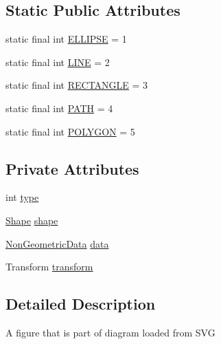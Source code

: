 \subsection*{Static Public Attributes}
\begin{DoxyCompactItemize}
\item 
static final int \mbox{\hyperlink{classorg_1_1newdawn_1_1slick_1_1svg_1_1_figure_a3754f01dc8ef5e4b0f610afbba382a7e}{E\+L\+L\+I\+P\+SE}} = 1
\item 
static final int \mbox{\hyperlink{classorg_1_1newdawn_1_1slick_1_1svg_1_1_figure_aa7aa5c6edabf75145d536a9e5a2eb0fc}{L\+I\+NE}} = 2
\item 
static final int \mbox{\hyperlink{classorg_1_1newdawn_1_1slick_1_1svg_1_1_figure_a33b1b86b98b3d31f811d6508dcf2ce7c}{R\+E\+C\+T\+A\+N\+G\+LE}} = 3
\item 
static final int \mbox{\hyperlink{classorg_1_1newdawn_1_1slick_1_1svg_1_1_figure_a32dd49a9d771a1814ffb01acd7a25a0a}{P\+A\+TH}} = 4
\item 
static final int \mbox{\hyperlink{classorg_1_1newdawn_1_1slick_1_1svg_1_1_figure_ad6ae0b7da84b63e19b80311c82ac32fa}{P\+O\+L\+Y\+G\+ON}} = 5
\end{DoxyCompactItemize}
\subsection*{Private Attributes}
\begin{DoxyCompactItemize}
\item 
int \mbox{\hyperlink{classorg_1_1newdawn_1_1slick_1_1svg_1_1_figure_a13aa6b5f3b570fcdd83fa792c4df142b}{type}}
\item 
\mbox{\hyperlink{classorg_1_1newdawn_1_1slick_1_1geom_1_1_shape}{Shape}} \mbox{\hyperlink{classorg_1_1newdawn_1_1slick_1_1svg_1_1_figure_a8f61c893d97589c745d42f6146d8670e}{shape}}
\item 
\mbox{\hyperlink{classorg_1_1newdawn_1_1slick_1_1svg_1_1_non_geometric_data}{Non\+Geometric\+Data}} \mbox{\hyperlink{classorg_1_1newdawn_1_1slick_1_1svg_1_1_figure_a31e90c8351882640950687c7e8587091}{data}}
\item 
Transform \mbox{\hyperlink{classorg_1_1newdawn_1_1slick_1_1svg_1_1_figure_a026c30ce2ef9b710c6bd51ff60c0b887}{transform}}
\end{DoxyCompactItemize}


\subsection{Detailed Description}
A figure that is part of diagram loaded from S\+VG

